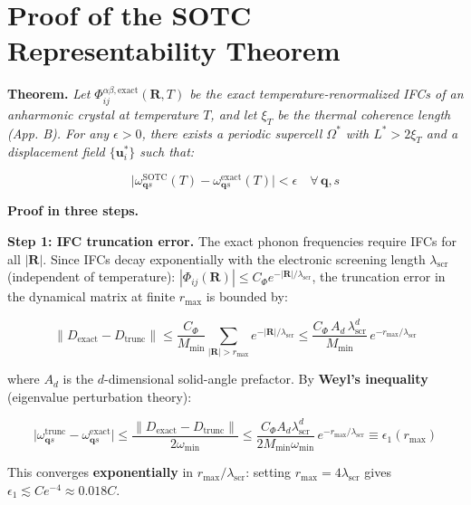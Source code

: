 \documentclass[aps,prb,reprint,amsmath,amssymb,floatfix]{revtex4-2}
\begin{document}
\section{Proof of the SOTC Representability
Theorem}\label{appendix-e-proof-of-the-sotc-representability-theorem}

\textbf{Theorem.} \emph{Let
\(\Phi_{ij}^{\alpha\beta,\text{exact}}(\mathbf{R},T)\) be the exact
temperature-renormalized IFCs of an anharmonic crystal at temperature
\(T\), and let \(\xi_T\) be the thermal coherence length (App. B). For
any \(\epsilon > 0\), there exists a periodic supercell \(\Omega^*\)
with \(L^* > 2\xi_T\) and a displacement field \(\{\mathbf{u}_i^*\}\)
such that:}

\begin{equation*}
\bigl|\omega_{\mathbf{q}s}^\text{SOTC}(T) - \omega_{\mathbf{q}s}^\text{exact}(T)\bigr| < \epsilon \quad \forall\,\mathbf{q},s
\end{equation*}

\textbf{Proof in three steps.}

\textbf{Step 1: IFC truncation error.} The exact phonon frequencies
require IFCs for all \(|\mathbf{R}|\). Since IFCs decay exponentially
with the electronic screening length \(\lambda_\text{scr}\) (independent
of temperature):
\(|\Phi_{ij}(\mathbf{R})| \leq C_\Phi e^{-|\mathbf{R}|/\lambda_\text{scr}}\),
the truncation error in the dynamical matrix at finite \(r_\text{max}\)
is bounded by:

{\scriptsize
\begin{equation*}
\|D_\text{exact} - D_\text{trunc}\| \leq \frac{C_\Phi}{M_\text{min}}\sum_{|\mathbf{R}|>r_\text{max}} e^{-|\mathbf{R}|/\lambda_\text{scr}} \leq \frac{C_\Phi\,A_d\,\lambda_\text{scr}^d}{M_\text{min}}\,e^{-r_\text{max}/\lambda_\text{scr}}
\end{equation*}
}

where \(A_d\) is the \(d\)-dimensional solid-angle prefactor. By
\textbf{Weyl's inequality} (eigenvalue perturbation theory):

{\scriptsize
\begin{equation*}
\bigl|\omega_{\mathbf{q}s}^\text{trunc} - \omega_{\mathbf{q}s}^\text{exact}\bigr| \leq \frac{\|D_\text{exact}-D_\text{trunc}\|}{2\omega_\text{min}} \leq \frac{C_\Phi A_d\lambda_\text{scr}^d}{2M_\text{min}\omega_\text{min}}\,e^{-r_\text{max}/\lambda_\text{scr}} \equiv \epsilon_1(r_\text{max})
\end{equation*}
}

This converges \textbf{exponentially} in
\(r_\text{max}/\lambda_\text{scr}\): setting
\(r_\text{max} = 4\lambda_\text{scr}\) gives
\(\epsilon_1 \lesssim Ce^{-4} \approx 0.018C\).
\end{document}
